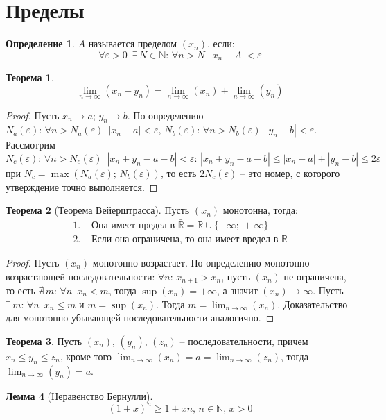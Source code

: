 \documentclass[12pt]{article}
\theoremstyle{definition}
\newtheorem{theorem}{Теорема}[section]
\newtheorem{lemma}[theorem]{Лемма}
\newtheorem{definition}{Определение}
\newcommand{\N}{\mathbb{N}}
\newcommand{\R}{\mathbb{R}}
\begin{document}
\section{Пределы}
\begin{definition}
    $A$ называется пределом $(x_n)$, если:
    $$\forall \varepsilon >0\,\,\,\exists\,N\in\N:\,\forall n>N\,\,\,|x_n-A|<\varepsilon$$
\end{definition}
\begin{theorem}
    $$\lim_{n\to\infty}(x_n+y_n)=\lim_{n\to\infty}(x_n)+\lim_{n\to\infty}(y_n)$$
\end{theorem}
\begin{proof}
    Пусть $x_n\to a;\,y_n\to b$. По определению $N_a(\varepsilon):\,\forall n>N_a(\varepsilon)\,\,\,|x_n-a|<\varepsilon,\,N_b(\varepsilon):\,\forall n>N_b(\varepsilon)\,\,\,|y_n-b|<\varepsilon$. Рассмотрим $N_c(\varepsilon):\,\forall n>N_c(\varepsilon)\,\,\,|x_n+y_n-a-b|<\varepsilon:\,|x_n+y_n-a-b|\leq|x_n-a|+|y_n-b|\leq 2\varepsilon$ при $N_c=\max(N_a(\varepsilon);\,N_b(\varepsilon))$, то есть $2N_c(\varepsilon)$ -- это номер, с которого утверждение точно выполняется.
\end{proof}
\begin{theorem}[Теорема Вейерштрасса]
    Пусть $(x_n)$ монотонна, тогда:
    \begin{align*}
        1.\,\,&\text{Она имеет предел в }\bar{\R}=\R\cup\{-\infty;\,+\infty\}\\
        2.\,\,&\text{Если она ограничена, то она имеет вредел в }\R
    \end{align*}
\end{theorem}
\begin{proof}
    Пусть $(x_n)$ монотонно возрастает. По определению монотонно возрастающей последовательности: $\forall n:\, x_{n+1}>x_n$, пусть $(x_n)$ не ограничена, то есть $\nexists\,m:\,\forall n\,\,\,x_n<m$, тогда $\sup(x_n)=+\infty$, а значит $(x_n)\to \infty$. Пусть $\exists\,m:\,\forall n \,\,\,x_n\leq m$ и $m=\sup(x_n)$. Тогда $m=\lim_{n\to\infty}(x_n)$. Доказательство для монотонно убывающей последовательности аналогично.
\end{proof}
\begin{theorem}
    Пусть $(x_n)$, $(y_n)$, $(z_n)$ -- последовательности, причем $x_n\leq y_n\leq z_n$, кроме того $\lim_{n\to\infty}(x_n)=a=\lim_{n\to\infty}(z_n)$, тогда $\lim_{n\to\infty}(y_n)=a$.
\end{theorem}
\begin{lemma}[Неравенство Бернулли]
    $$(1+x)^n\geq 1+xn,\,n\in \N,\,x>0$$
\end{lemma}
\end{document}
